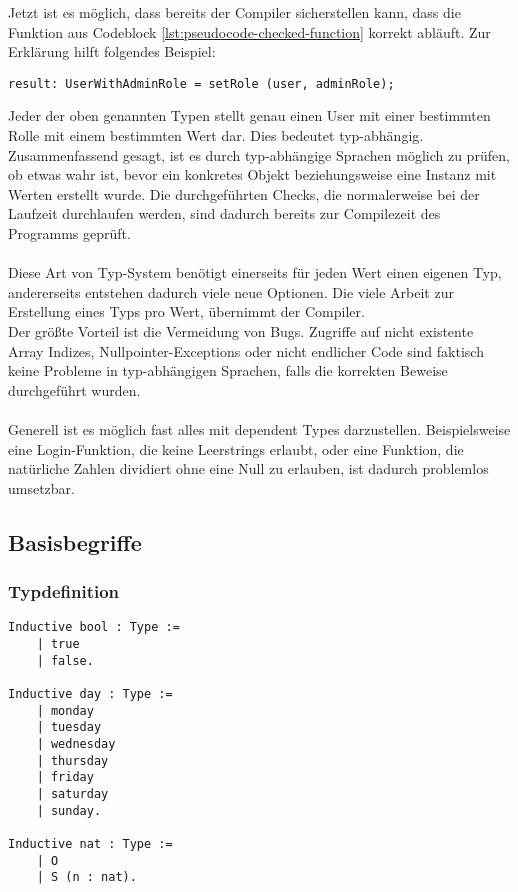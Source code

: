 Jetzt ist es möglich, dass bereits der Compiler sicherstellen kann, dass die Funktion aus Codeblock \ref{lst:pseudocode-checked-function} korrekt abläuft. Zur Erklärung hilft folgendes Beispiel:
\begin{lstlisting}[language=coq,firstnumber=1,caption=Pseudocode Check auf null des User Objektes,label=lst:pseudocode-checked-function-usage]
result: UserWithAdminRole = setRole (user, adminRole);
\end{lstlisting}
Jeder der oben genannten Typen stellt genau einen User mit einer bestimmten Rolle mit einem bestimmten Wert dar. Dies bedeutet typ-abhängig.\cite{MARTIN01:FV}
Zusammenfassend gesagt, ist es durch typ-abhängige Sprachen möglich zu prüfen, ob etwas wahr ist, bevor ein konkretes Objekt beziehungsweise eine Instanz mit Werten erstellt wurde. Die durchgeführten Checks, die normalerweise bei der Laufzeit durchlaufen werden, sind dadurch bereits zur Compilezeit des Programms geprüft.\\
\\
Diese Art von Typ-System benötigt einerseits für jeden Wert einen eigenen Typ, andererseits entstehen dadurch viele neue Optionen. Die viele Arbeit zur Erstellung eines Typs pro Wert, übernimmt der Compiler.\\
Der größte Vorteil ist die Vermeidung von Bugs. Zugriffe auf nicht existente Array Indizes, Nullpointer-Exceptions oder nicht endlicher Code sind faktisch keine Probleme in typ-abhängigen Sprachen, falls die korrekten Beweise durchgeführt wurden.\\
\\
Generell ist es möglich fast alles mit dependent Types darzustellen. Beispielsweise eine Login-Funktion, die keine Leerstrings erlaubt, oder eine Funktion, die natürliche Zahlen dividiert ohne eine Null zu erlauben, ist dadurch problemlos umsetzbar.
\subsection{Basisbegriffe}
\subsubsection{Typdefinition}
\begin{lstlisting}[language=coq,firstnumber=1,caption=Coq Typedefinition,label=lst:typedefinition]
Inductive bool : Type :=
	| true
	| false.
	
Inductive day : Type :=
	| monday
	| tuesday
	| wednesday
	| thursday
	| friday
	| saturday
	| sunday.
	
Inductive nat : Type :=
	| O
	| S (n : nat).
\end{lstlisting}

